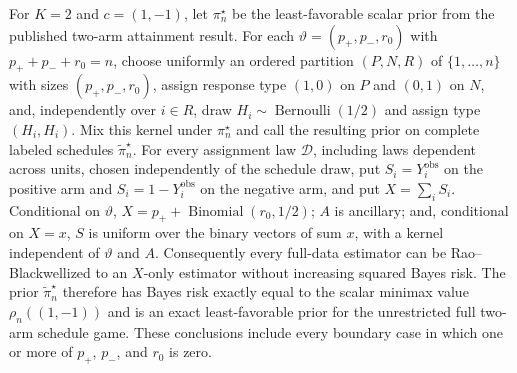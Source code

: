 For \(K=2\) and \(c=(1,-1)\), let \(\pi_n^\star\) be the least-favorable scalar prior from the published two-arm attainment result. For each \(\vartheta=(p_+,p_-,r_0)\) with \(p_++p_-+r_0=n\), choose uniformly an ordered partition \((P,N,R)\) of \(\{1,\ldots,n\}\) with sizes \((p_+,p_-,r_0)\), assign response type \((1,0)\) on \(P\) and \((0,1)\) on \(N\), and, independently over \(i\in R\), draw \(H_i\sim\operatorname{Bernoulli}(1/2)\) and assign type \((H_i,H_i)\). Mix this kernel under \(\pi_n^\star\) and call the resulting prior on complete labeled schedules \(\widetilde\pi_n^\star\). For every assignment law \(\mathcal D\), including laws dependent across units, chosen independently of the schedule draw, put \(S_i=Y_i^{\mathrm{obs}}\) on the positive arm and \(S_i=1-Y_i^{\mathrm{obs}}\) on the negative arm, and put \(X=\sum_iS_i\). Conditional on \(\vartheta\), \(X=p_++\operatorname{Binomial}(r_0,1/2)\); \(A\) is ancillary; and, conditional on \(X=x\), \(S\) is uniform over the binary vectors of sum \(x\), with a kernel independent of \(\vartheta\) and \(A\). Consequently every full-data estimator can be Rao--Blackwellized to an \(X\)-only estimator without increasing squared Bayes risk. The prior \(\widetilde\pi_n^\star\) therefore has Bayes risk exactly equal to the scalar minimax value \(\rho_n((1,-1))\) and is an exact least-favorable prior for the unrestricted full two-arm schedule game. These conclusions include every boundary case in which one or more of \(p_+\), \(p_-\), and \(r_0\) is zero.